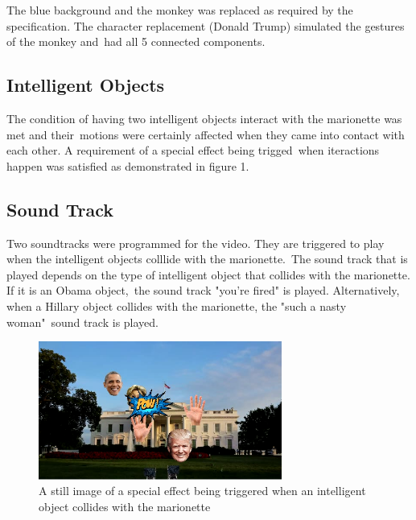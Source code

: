 \documentclass[12pt,a4paper]{article}
\begin{document}
      The blue background and the monkey was replaced as required by the specification. The character replacement (Donald Trump) simulated the gestures of the monkey and\
      had all 5 connected components.

      \subsection{Intelligent Objects}

      The condition of having two intelligent objects interact with the marionette was met and their\
      motions were certainly affected when they came into contact with each other. A requirement of a special effect being trigged\
      when iteractions happen was satisfied as demonstrated in figure 1.

      \subsection{Sound Track}

      Two soundtracks were programmed for the video. They are triggered to play when the intelligent objects colllide with the marionette.\
      The sound track that is played depends on the type of intelligent object that collides with the marionette. If it is an Obama object,\
      the sound track "you're fired" is played. Alternatively, when a Hillary object collides with the marionette, the "such a nasty woman"\
      sound track is played.

        \begin{figure}[H]
          \includegraphics[width=8cm]{pow}
          \caption{A still image of a special effect being triggered when an intelligent object collides with the marionette}
        \end{figure}
\end{document}
